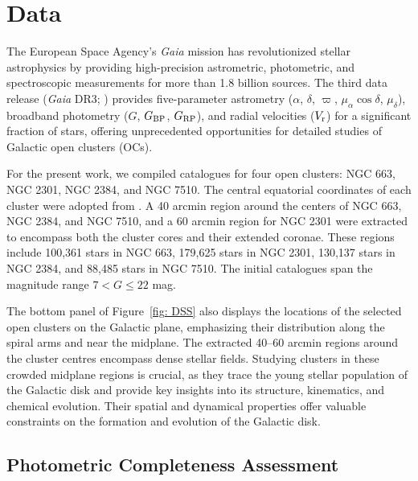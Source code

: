 \documentclass[referee]{raa}            %
\begin{document}
\section{Data}
\label{sec:Data}

The European Space Agency’s \textit{Gaia} mission has revolutionized stellar astrophysics by providing high-precision astrometric, photometric, and spectroscopic measurements for more than 1.8 billion sources. The third data release (\textit{Gaia} DR3; \citealt{GaiaDR3}) provides five-parameter astrometry ($\alpha$, $\delta$, $\varpi$, $\mu_{\alpha}\cos\delta$, $\mu_{\delta}$), broadband photometry ($G$, $G_{\rm BP}$, $G_{\rm RP}$), and radial velocities ($V_{\rm r}$) for a significant fraction of stars, offering unprecedented opportunities for detailed studies of Galactic open clusters (OCs). 

For the present work, we compiled catalogues for four open clusters: NGC 663, NGC 2301, NGC 2384, and NGC 7510. The central equatorial coordinates of each cluster were adopted from \citet{Cantat_2020}. A 40 arcmin region around the centers of NGC 663, NGC 2384, and NGC 7510, and a 60 arcmin region for NGC 2301 were extracted to encompass both the cluster cores and their extended coronae. These regions include 100,361 stars in NGC 663, 179,625 stars in NGC 2301, 130,137 stars in NGC 2384, and 88,485 stars in NGC 7510. The initial catalogues span the magnitude range $7 < G \leq 22$ mag.

The bottom panel of Figure~\ref{fig: DSS} also displays the locations of the selected open clusters on the Galactic plane, emphasizing their distribution along the spiral arms and near the midplane. The extracted 40–60 arcmin regions around the cluster centres encompass dense stellar fields. Studying clusters in these crowded midplane regions is crucial, as they trace the young stellar population of the Galactic disk and provide key insights into its structure, kinematics, and chemical evolution. Their spatial and dynamical properties offer valuable constraints on the formation and evolution of the Galactic disk.



\subsection{Photometric Completeness Assessment}
\end{document}
